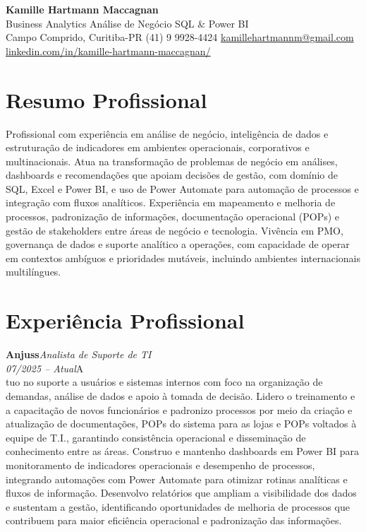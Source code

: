 \documentclass[11pt,a4paper]{article}
\newcommand{\cvrole}[4]{%
  \vspace{4pt}%
  {\bfseries\color{accentcolor}#1}\hfill{\itshape #2}\\[-2pt]%
  {\itshape #3}\hfill #4\\[6pt]%
}
\begin{document}
\begin{center}
  {\fontsize{20}{24}\selectfont\bfseries Kamille Hartmann Maccagnan}\\[8pt]
  {\large Business Analytics \textbar{} Análise de Negócio \textbar{} SQL \& Power BI}\\[10pt]
  Campo Comprido, Curitiba-PR \enspace\textbullet\enspace (41) 9 9928-4424 \enspace\textbullet\enspace
  \href{mailto:kamillehartmannm@gmail.com}{kamillehartmannm@gmail.com}\\[3pt]
  \href{https://linkedin.com/in/kamille-hartmann-maccagnan/}{linkedin.com/in/kamille-hartmann-maccagnan/}
\end{center}

\vspace{6pt}

\section{Resumo Profissional}

Profissional com experiência em análise de negócio, inteligência de dados e estruturação de indicadores em ambientes operacionais, corporativos e multinacionais. Atua na transformação de problemas de negócio em análises, dashboards e recomendações que apoiam decisões de gestão, com domínio de SQL, Excel e Power BI, e uso de Power Automate para automação de processos e integração com fluxos analíticos. Experiência em mapeamento e melhoria de processos, padronização de informações, documentação operacional (POPs) e gestão de stakeholders entre áreas de negócio e tecnologia. Vivência em PMO, governança de dados e suporte analítico a operações, com capacidade de operar em contextos ambíguos e prioridades mutáveis, incluindo ambientes internacionais multilíngues.

\section{Experiência Profissional}

\cvrole{Anjuss}{Analista de Suporte de TI}{07/2025 -- Atual}

Atuo no suporte a usuários e sistemas internos com foco na organização de demandas, análise de dados e apoio à tomada de decisão. Lidero o treinamento e a capacitação de novos funcionários e padronizo processos por meio da criação e atualização de documentações, POPs do sistema para as lojas e POPs voltados à equipe de T.I., garantindo consistência operacional e disseminação de conhecimento entre as áreas. Construo e mantenho dashboards em Power BI para monitoramento de indicadores operacionais e desempenho de processos, integrando automações com Power Automate para otimizar rotinas analíticas e fluxos de informação. Desenvolvo relatórios que ampliam a visibilidade dos dados e sustentam a gestão, identificando oportunidades de melhoria de processos que contribuem para maior eficiência operacional e padronização das informações.
\end{document}

